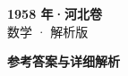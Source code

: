 \documentclass[zihao=-4, a4paper]{ctexart}
\begin{document}
\begin{center}
  {\Large\bfseries 1958 年·河北卷}\\[4pt]
  {\large 数学 · 解析版}
\end{center}
\medskip
{}

\clearpage
{}
\begin{center}{\Large\bfseries 参考答案与详细解析}\end{center}
\medskip

\end{document}
